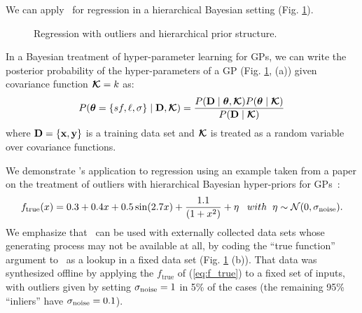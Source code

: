 We can apply \gpmem\ for regression in a hierarchical Bayesian setting
(Fig. \ref{fig:neal_tutorial}).  
\begin{figure}

\captionsetup{aboveskip=-7pt}
\caption{\footnotesize Regression with outliers and hierarchical prior
structure.}
\label{fig:neal_tutorial}
\end{figure}
In a Bayesian treatment of  hyper-parameter learning for \ac{GP}s,
we can write the posterior probability of the hyper-parameters of a GP  (Fig.
\ref{fig:neal_tutorial}, (a)) given covariance function $\bm{\mathcal{K}}=k$ as:
\begin{equation}
\label{eq:hyperProbability}
P(\bm{\theta}=\{sf,\ell,\sigma\} \mid \mathbf{D},\bm{\mathcal{K}} ) = \frac{P(\mathbf{D} \mid
\bm{\theta}, \bm{\mathcal{K}})P(\bm{\theta} \mid \bm{\mathcal{K}}) }{P(\mathbf{D} \mid
\bm{\mathcal{K}})}
\end{equation}
where $\mathbf{D} = \{\mathbf{x}, \mathbf{y}\}$ is a training data set and $\bm{\mathcal{K}}$ is treated
as a random variable over covariance functions.

We demonstrate \gpmem's application to regression using an example
taken from a paper on the treatment of outliers with hierarchical
Bayesian hyper-priors for \ac{GP}s~\citep{neal1997monte}:
\begin{equation}
f_\text{true}(x) =  0.3 + 0.4 x + 0.5 \sin(2.7x) + \frac{1.1}{(1+ x^2)} + \eta
\;\;\; with\;\;\eta \sim \mathcal{N}(0,\sigma_{\text{noise}}). \label{eq:f_true}
\end{equation}
We emphasize that \gpmem\ can be used with externally collected
data sets whose generating process may not be available at all,
by coding the ``true function'' argument to \gpmem\ as a lookup
in a fixed data set (Fig. \ref{fig:neal_tutorial} (b)).
That data was synthesized offline by applying the $f_\text{true}$ of (\ref{eq:f_true})
to a fixed set of inputs, with outliers given by setting $\sigma_{\text{noise}} = 1$ in 5\% of
the cases (the remaining 95\% ``inliers'' have $\sigma_{\text{noise}} = 0.1$).

